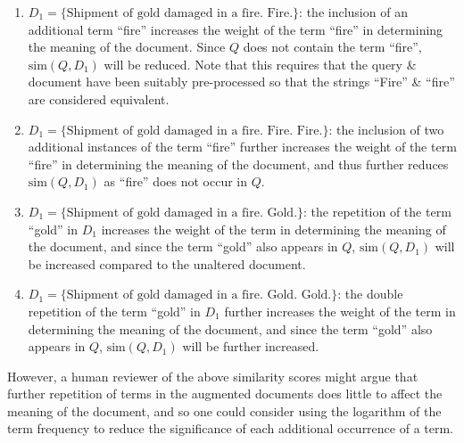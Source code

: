 \documentclass[a4paper]{article}
\begin{document}
\begin{enumerate}[label=\alph*)]
    \item   $D_1 = \{ \text{Shipment of gold damaged in a fire. Fire.} \}$:
            the inclusion of an additional term ``fire'' increases the weight of the term ``fire'' in determining the meaning of the document.
            Since $Q$ does not contain the term ``fire'', $\text{sim}(Q, D_1)$ will be reduced.
            Note that this requires that the query \& document have been suitably pre-processed so that the strings ``Fire'' \& ``fire'' are considered equivalent.

    \item   $D_1 = \{ \text{Shipment of gold damaged in a fire. Fire. Fire.} \}$:
            the inclusion of two additional instances of the term ``fire'' further increases the weight of the term ``fire'' in determining the meaning of the document, and thus further reduces $\text{sim}(Q, D_1)$ as ``fire'' does not occur in $Q$.

    \item   $D_1 = \{ \text{Shipment of gold damaged in a fire. Gold.} \}$:
            the repetition of the term ``gold'' in $D_1$ increases the weight of the term in determining the meaning of the document, and since the term ``gold'' also appears in $Q$, $\text{sim}(Q, D_1)$ will be increased compared to the unaltered document.

    \item   $D_1 = \{ \text{Shipment of gold damaged in a fire. Gold. Gold.} \}$:
            the double repetition of the term ``gold'' in $D_1$ further increases the weight of the term in determining the meaning of the document, and since the term ``gold'' also appears in $Q$, $\text{sim}(Q, D_1)$ will be further increased.
\end{enumerate}

However, a human reviewer of the above similarity scores might argue that further repetition of terms in the augmented documents does little to affect the meaning of the document, and so one could consider using the logarithm of the term frequency to reduce the significance of each additional occurrence of a term.
\end{document}
